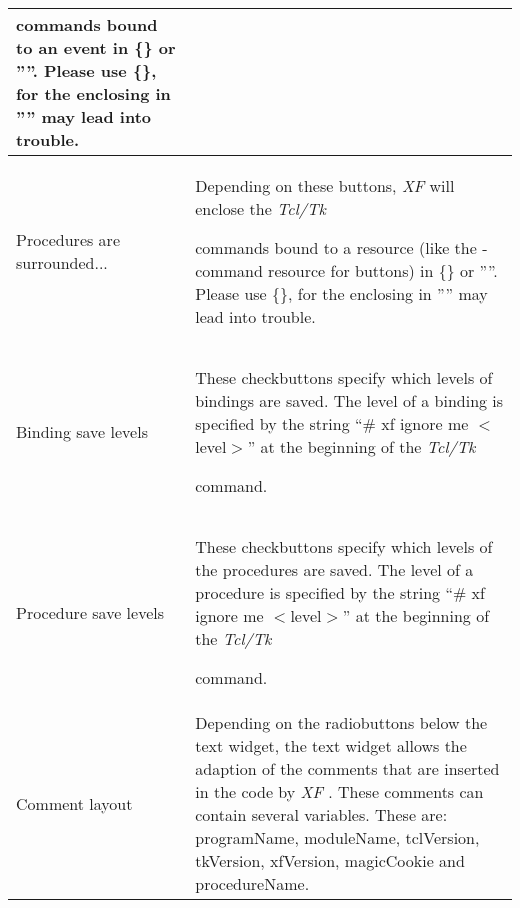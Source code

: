 {\begin{supertabular}{|l|p{6.2cm}|}
                               commands bound to an event in
                               \{\} or ''''. Please use
                               \{\}, for the enclosing in
                               '''' may lead into trouble.\\  \hline
Procedures are surrounded... & Depending on these buttons,
                               {\em XF }
 will enclose the {\em Tcl/Tk }

                               commands bound to a resource
                               (like the -command resource
                               for buttons) in \{\} or ''''.
                               Please use \{\}, for the
                               enclosing in '''' may lead
                               into trouble.\\  \hline
Binding save levels          & These checkbuttons specify
                               which levels of bindings are
                               saved. The level of a
                               binding is specified by the
                               string ``\# xf ignore me
                               $<$level$>$'' at the
                               beginning of the {\em Tcl/Tk }

                               command.\\  \hline
Procedure save levels        & These checkbuttons specify
                               which levels of the
                               procedures are saved. The
                               level of a procedure is
                               specified by the string ``\#
                               xf ignore me $<$level$>$'' at
                               the beginning of the {\em Tcl/Tk }

                               command.\\  \hline
Comment layout               & Depending on the radiobuttons
                               below the text widget, the
                               text widget allows the
                               adaption of the comments that
                               are inserted in the code by
                               {\em XF}
. These comments can
                               contain several variables.
                               These are: programName,
                               moduleName, tclVersion,
                               tkVersion, xfVersion,
                               magicCookie and procedureName.\\
\end{supertabular}
}

